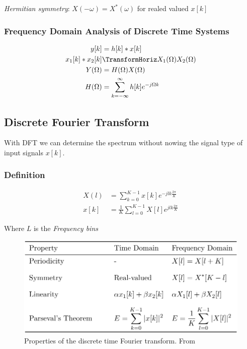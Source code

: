 

\textit{Hermitian symmetry}: $X(-\omega)=X^*(\omega)$ for realed valued $x[k]$

\subsubsection{Frequency Domain Analysis of Discrete Time Systems}
\begin{align*}
    y[k] &= h[k]*x[k] \\
    x_1[k]*x_2[k] &\TransformHoriz  X_1(\Omega)X_2(\Omega) \\
    Y(\Omega) &= H(\Omega)X(\Omega) \\
    H(\Omega) &= \sum_{k=-\infty}^{\infty} h[k]e^{-j\Omega k}
\end{align*}


\subsection{Discrete Fourier Transform}
With DFT we can determine the spectrum without nowing the signal type
of input signals $x[k]$.

\subsubsection{Definition}
\begin{align*}
    X(l) &= \sum_{k=0}^{K-1} x[k]e^{-jlk\frac{2\pi}{K}} \\
    x[k] &= \frac{1}{K}\sum_{l=0}^{K-1}X[l]e^{jlk\frac{2\pi}{K}}
\end{align*}

Where $L$ is the \textit{Frequency bins}

\begin{figure}[H]
    \centering
    \includegraphics[width=12cm]{image/properties_of_the_dft.png}
    \caption{Properties of the discrete time Fourier transform. From \cite{st}}
    \label{fig:properties_of_the_dft}
\end{figure}


